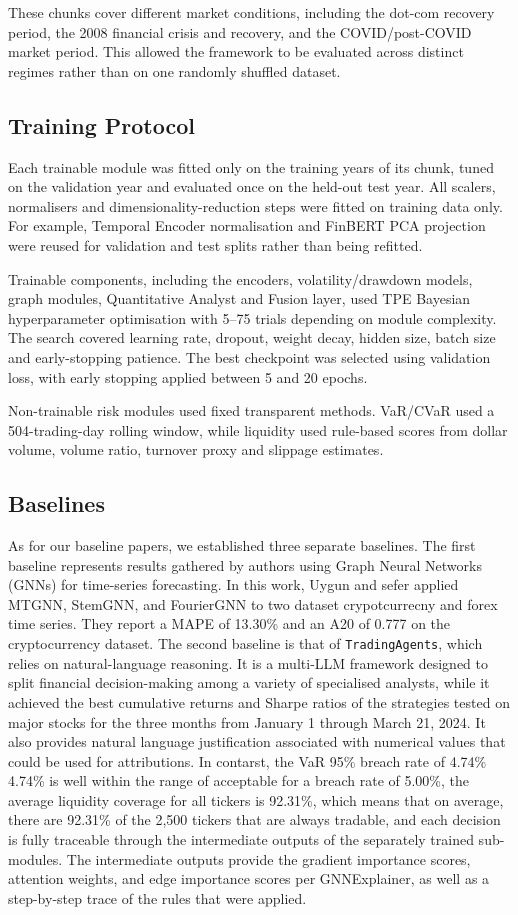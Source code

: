 \documentclass[conference]{IEEEtran}
\begin{document}
These chunks cover different market conditions, including the dot-com recovery period, the 2008 financial crisis and recovery, and the COVID/post-COVID market period. This allowed the framework to be evaluated across distinct regimes rather than on one randomly shuffled dataset.

\subsection{Training Protocol}
Each trainable module was fitted only on the training years of its chunk, tuned on the validation year and evaluated once on the held-out test year. All scalers, normalisers and dimensionality-reduction steps were fitted on training data only. For example, Temporal Encoder normalisation and FinBERT PCA projection were reused for validation and test splits rather than being refitted.

Trainable components, including the encoders, volatility/drawdown models, graph modules, Quantitative Analyst and Fusion layer, used TPE Bayesian hyperparameter optimisation with 5--75 trials depending on module complexity. The search covered learning rate, dropout, weight decay, hidden size, batch size and early-stopping patience. The best checkpoint was selected using validation loss, with early stopping applied between 5 and 20 epochs.

Non-trainable risk modules used fixed transparent methods. VaR/CVaR used a 504-trading-day rolling window, while liquidity used rule-based scores from dollar volume, volume ratio, turnover proxy and slippage estimates.


\subsection{Baselines}
As for our baseline papers, we established three separate baselines. The first baseline represents results gathered by authors using Graph Neural Networks (GNNs) for time-series forecasting.\cite{13thPaper}  In this work, Uygun and sefer applied MTGNN\cite{MTGNN}, StemGNN\cite{StemGNN}, and FourierGNN to two dataset crypotcurrecny and forex time series. They report a MAPE of 13.30\% and an A20 of 0.777 on the cryptocurrency dataset. The second baseline is that of \texttt{TradingAgents}, which relies on natural-language reasoning. It is a multi-LLM framework designed to split financial decision-making among a variety of specialised analysts, while it achieved the best cumulative returns and Sharpe ratios of the strategies tested on major stocks for the three months from January 1 through March 21, 2024.  It also provides natural language justification associated with numerical values that could be used for attributions. In contarst, the VaR 95\% breach rate of 4.74\% 4.74\% is well within the range of acceptable for a breach rate of 5.00\%, the average liquidity coverage for all tickers is 92.31\%, which means that on average, there are 92.31\% of the 2,500 tickers that are always tradable, and each decision is fully traceable through the intermediate outputs of the separately trained sub-modules. The intermediate outputs provide the gradient importance scores, attention weights, and edge importance scores per GNNExplainer, as well as a step-by-step trace of the rules that were applied.
\end{document}
